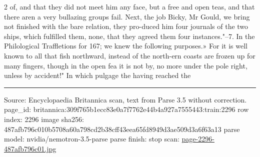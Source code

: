 \documentclass[10pt]{article}
\begin{document}
\begin{multicols}{2}
of, and that they did not meet him any face, but a free and open teas, and that there aren a very bullazing groups fail. Next, the job Bicky, Mr Gould, we bring not finished with the bare relation, they pro-duced him four journals of the two ships, which fulfilled them, none, that they agreed them four instances."--7. In the Philological Traffletions for 167; we knew the following purposes.» For it is well known to all that fish northward, instead of the north-ern coasts are frozen up for many fingers, though in the open fea it is not by, no more under the pole right, unless by accident!" In which pulgage the having reached the

\end{multicols}
\vfill\par\noindent\rule{\linewidth}{0.4pt}\par
{\scriptsize\color{gray}\noindent Source: Encyclopaedia Britannica scan, text from Parse 3.5 without correction. page\_id: britannica:309f765b1ecc83e0a7f7762e44b4a927a7555443:train:2296 \quad row index: 2296 \quad image sha256: 487afb796c010b5708a60a798cd2b38cff43eea65fd8949d3ae509d3a6f63a13 \quad parse model: nvidia/nemotron-3.5-parse \quad parse finish: stop \quad scan: \href{../scans/page-2296-487afb796c01.jpg}{page-2296-487afb796c01.jpg}\par}
\end{document}
